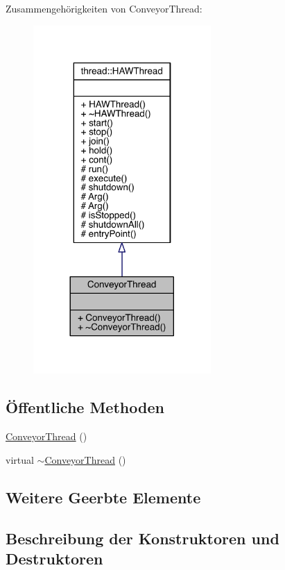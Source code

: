 Zusammengehörigkeiten von Conveyor\+Thread\+:
\nopagebreak
\begin{figure}[H]
\begin{center}
\leavevmode
\includegraphics[width=192pt]{class_conveyor_thread__coll__graph}
\end{center}
\end{figure}
\subsection*{Öffentliche Methoden}
\begin{DoxyCompactItemize}
\item 
\hyperlink{class_conveyor_thread_a2068e0741d46acdd2738d65447b594b6}{Conveyor\+Thread} ()
\item 
virtual \hyperlink{class_conveyor_thread_ac496ae2a4708c7cd3af20721c1bf8b8a}{$\sim$\+Conveyor\+Thread} ()
\end{DoxyCompactItemize}
\subsection*{Weitere Geerbte Elemente}


\subsection{Beschreibung der Konstruktoren und Destruktoren}
\hypertarget{class_conveyor_thread_a2068e0741d46acdd2738d65447b594b6}{}\label{class_conveyor_thread_a2068e0741d46acdd2738d65447b594b6} 

